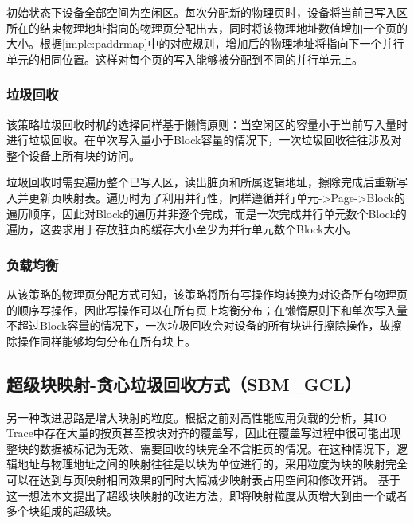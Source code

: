 初始状态下设备全部空间为空闲区。每次分配新的物理页时，设备将当前已写入区所在的结束物理地址指向的物理页分配出去，同时将该物理地址数值增加一个页的大小。根据\ref{imple:paddrmap}中的对应规则，增加后的物理地址将指向下一个并行单元的相同位置。这样对每个页的写入能够被分配到不同的并行单元上。
\subsubsection{垃圾回收}
该策略垃圾回收时机的选择同样基于懒惰原则：当空闲区的容量小于当前写入量时进行垃圾回收。在单次写入量小于Block容量的情况下，一次垃圾回收往往涉及对整个设备上所有块的访问。

垃圾回收时需要遍历整个已写入区，读出脏页和所属逻辑地址，擦除完成后重新写入并更新页映射表。遍历时为了利用并行性，同样遵循并行单元->Page->Block的遍历顺序，因此对Block的遍历并非逐个完成，而是一次完成并行单元数个Block的遍历，这要求用于存放脏页的缓存大小至少为并行单元数个Block大小。
\subsubsection{负载均衡}
从该策略的物理页分配方式可知，该策略将所有写操作均转换为对设备所有物理页的顺序写操作，因此写操作可以在所有页上均衡分布；在懒惰原则下和单次写入量不超过Block容量的情况下，一次垃圾回收会对设备的所有块进行擦除操作，故擦除操作同样能够均匀分布在所有块上。

\subsection{超级块映射-贪心垃圾回收方式（SBM\_GCL）}
另一种改进思路是增大映射的粒度。根据之前对高性能应用负载的分析，其IO Trace中存在大量的按页甚至按块对齐的覆盖写，因此在覆盖写过程中很可能出现整块的数据被标记为无效、需要回收的块完全不含脏页的情况。在这种情况下，逻辑地址与物理地址之间的映射往往是以块为单位进行的，采用粒度为块的映射完全可以在达到与页映射相同效果的同时大幅减少映射表占用空间和修改开销。
基于这一想法本文提出了超级块映射的改进方法，即将映射粒度从页增大到由一个或者多个块组成的超级块。
